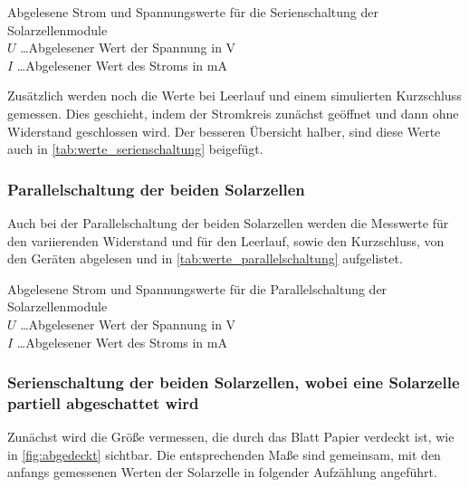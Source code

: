 \documentclass[12pt,english,ngerman]{scrartcl}
\begin{document}
\begin{table}[H]
	\caption[Abgelesene Strom und Spannungswerte für die Serienschaltung der
		Solarzellenmodule] {Abgelesene Strom und Spannungswerte für die Serienschaltung
		der Solarzellenmodule                        \\
		$U$ \dots Abgelesener Wert der Spannung in V \\
		$I$ \dots Abgelesener Wert des Stroms in mA
	}\label{tab:werte_serienschaltung}
	\centering
	
\end{table}

Zusätzlich werden noch die Werte bei Leerlauf und einem simulierten Kurzschluss
gemessen. Dies geschieht, indem der Stromkreis zunächst geöffnet und dann ohne
Widerstand geschlossen wird. Der besseren Übersicht halber, sind diese Werte
auch in \autoref{tab:werte_serienschaltung} beigefügt.

\subsubsection{Parallelschaltung der beiden Solarzellen}
Auch bei der Parallelschaltung der beiden Solarzellen werden die Messwerte für
den variierenden Widerstand und für den Leerlauf, sowie den Kurzschluss, von
den Geräten abgelesen und in \autoref{tab:werte_parallelschaltung} aufgelistet.

\begin{table}[H]
	\caption[Abgelesene Strom und Spannungswerte für die Parallelschaltung der
		Solarzellenmodule] {Abgelesene Strom und Spannungswerte für die
		Parallelschaltung der Solarzellenmodule      \\
		$U$ \dots Abgelesener Wert der Spannung in V \\
		$I$ \dots Abgelesener Wert des Stroms in mA
	}\label{tab:werte_parallelschaltung}
	\centering
	
\end{table}

\subsubsection{Serienschaltung der beiden Solarzellen, wobei eine Solarzelle partiell abgeschattet wird}
Zunächst wird die Größe vermessen, die durch das Blatt Papier verdeckt ist, wie
in \autoref{fig:abgedeckt} sichtbar. Die entsprechenden Maße sind gemeinsam,
mit den anfangs gemessenen Werten der Solarzelle in folgender Aufzählung
angeführt.
\end{document}
